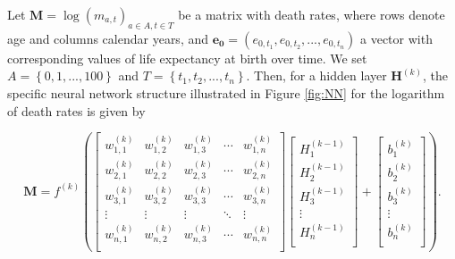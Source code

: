 \documentclass[a4,11pt]{article}
\begin{document}
Let $\mathbf{M}=\log(m_{a,t})_{a\in A,t\in T}$ be a matrix with death rates, where rows denote age and columns calendar years, and $\mathbf{e_{0}}=(e_{0,t_1},e_{0,t_2},...,e_{0,t_n})$ a vector with corresponding values of life expectancy at birth over time. We set $A=\left\{0,1,...,100\right\}$ and $T=\left\{t_1,t_2,...,t_n\right\}$. Then, for a hidden layer $\mathbf{H}^{(k)}$, the specific neural network structure illustrated in Figure \ref{fig:NN} for the logarithm of death rates is given by

%
\begin{equation}
\mathbf{M} =
f^{(k)} \left(
\begin{bmatrix}
w^{(k)}_{1,1} & w^{(k)}_{1,2} &w^{(k)}_{1,3} & \cdots & w^{(k)}_{1,n} \\
w^{(k)}_{2,1} & w^{(k)}_{2,2} &w^{(k)}_{2,3} & \cdots & w^{(k)}_{2,n} \\
w^{(k)}_{3,1} & w^{(k)}_{3,2} &w^{(k)}_{3,3} & \cdots & w^{(k)}_{3,n} \\
\vdots & \vdots & \vdots & \ddots & \vdots \\
w^{(k)}_{n,1} & w^{(k)}_{n,2} &w^{(k)}_{n,3} & \cdots & w^{(k)}_{n,n} \\
\end{bmatrix}
\begin{bmatrix}
H^{(k-1)}_{1} \\
H^{(k-1)}_{2} \\
H^{(k-1)}_{3} \\
\vdots   \\
H^{(k-1)}_{n} \\
\end{bmatrix}
+
\begin{bmatrix}
b^{(k)}_{1}\\
b^{(k)}_{2} \\
b^{(k)}_{3} \\
\vdots   \\
b^{(k)}_{n} \\
\end{bmatrix}
\right).
\label{eq:1}
\end{equation}
%
\end{document}
